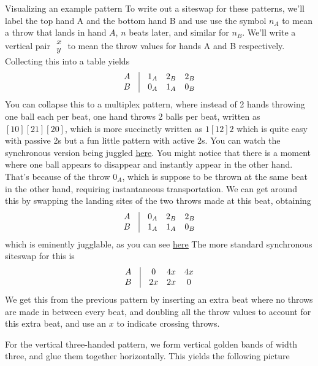 \documentclass[12nt]{article}
\theoremstyle{plain}
\begin{document}
\begin{subsection}{Visualizing an example pattern}
To write out a siteswap for these patterns, we'll label the top hand A and the bottom hand B and use use the symbol $n_A$ to mean a throw that lands in hand $A$, $n$ beats later, and similar for $n_B$. We'll write a vertical pair $\begin{array}{c} x \\ y \end{array}$ to mean the throw values for hands A and B respectively. Collecting this into a table yields
\[
\begin{array}{c c c c c }
A &\vline&  1_A & 2_B & 2_B \\
B &\vline&  0_A & 1_A & 0_B
\end{array}
\]
You can collapse this to a multiplex pattern, where instead of 2 hands throwing one ball each per beat, one hand throws 2 balls per beat, written as $[10][21][20]$, which is more succinctly written as $1[12]2$ which is quite easy with passive 2s but a fun little pattern with active 2s. You can watch the synchronous version being juggled \underline{\textcolor{blue}{\href{https://jugglingedge.com/help/siteswapanimator.php?Pattern=(2\%2C0x)(4x\%2C2x)(4x\%2C0)}{here}}}. You might notice that there is a moment where one ball appears to disappear and instantly appear in the other hand. That's because of the throw $0_A$, which is suppose to be thrown at the same beat in the other hand, requiring instantaneous transportation. We can get around this by swapping the landing sites of the two throws made at this beat, obtaining 
\[
\begin{array}{c c c c c }
A &\vline&  0_A & 2_B & 2_B \\
B &\vline&  1_A & 1_A & 0_B
\end{array}
\]
which is eminently jugglable, as you can see \underline{\textcolor{blue}{\href{https://jugglingedge.com/help/siteswapanimator.php?Pattern=(0\%2C2x)(4x\%2C2x)(4x\%2C0)}{here}}}
The more standard synchronous siteswap for this is 
\[
\begin{array}{c c c c c }
A &\vline&  0 & 4x & 4x \\
B &\vline&  2x & 2x & 0
\end{array}
\]
We get this from the previous pattern by inserting an extra beat where no throws are made in between every beat, and doubling all the throw values to account for this extra beat, and use an $x$ to indicate crossing throws.
 
\newpage 
For the vertical three-handed pattern, we form vertical golden bands of width three, and glue them together horizontally. This yields the following picture


\end{subsection}
\end{document}
